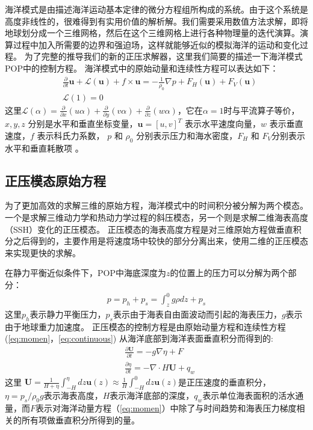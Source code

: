 海洋模式是由描述海洋运动基本定律的微分方程组所构成的系统。由于这个系统是高度非线性的，很难得到有实用价值的解析解。我们需要采用数值方法求解，即将地球划分成一个三维网格，然后在这个三维网格上进行各种物理量的迭代演算。演算过程中加入所需要的边界和强迫场，这样就能够近似的模拟海洋的运动和变化过程。
为了完整的推导我们的新的正压求解器，这里我们简要的描述一下海洋模式POP中的控制方程。
海洋模式中的原始动量和连续性方程可以表达如下：
\begin{align}
&\frac{\partial }{\partial t} \textbf{u} +\mathcal{L}(\textbf{u}) + f\times \textbf{u} = - \frac{1}{\rho_0}\nabla p +F_H(\textbf{u}) +F_V(\textbf{u}) \label{eq:momen}\\
&\mathcal{L}(1) = 0 \label{eq:continuous}
\end{align}
这里$\mathcal{L}(\alpha ) = \frac{\partial }{\partial x} (u\alpha)  +\frac{\partial }{\partial y} (v\alpha) +\frac{\partial }{\partial z} (w\alpha)$，它在$\alpha =1$时与平流算子等价，$x, y, z$ 分别是水平和垂直坐标变量，$\textbf{u} = [u, v]^T$ 表示水平速度向量，$w$ 表示垂直速度，$f$ 表示科氏力系数， $p$ 和 $\rho_0$ 分别表示压力和海水密度，$F_H$ 和 $F_V$分别表示水平和垂直耗散项 \cite{smith2010parallel}。  


\subsection{正压模态原始方程} \label{solver:mode}

为了更加高效的求解三维的原始方程，海洋模式中的时间积分被分解为两个模态。 一个是求解三维动力学和热动力学过程的斜压模态，另一个则是求解二维海表高度（SSH）变化的正压模态。
正压模态的海表高度方程是对三维原始方程做垂直积分之后得到的，主要作用是将速度场中较快的部分分离出来，使用二维的正压模态来实现更快的求解。

在静力平衡近似条件下，POP中海底深度为$z$的位置上的压力可以分解为两个部分：  
\begin{align}
\displaystyle p = p_h + p_s = \int^0_z g\rho dz +p_s
\end{align}
这里$p_h$表示静力平衡压力，$p_s$表示由于海表自由面波动而引起的海表压力，$g$表示由于地球重力加速度。 
正压模态的控制方程是由原始动量方程和连续性方程(\ref{eq:momen}，\ref{eq:continuous}) 从海洋底部到海洋表面垂直积分而得到的:
\begin{align}
&\displaystyle \frac{\partial \textbf{U} }{\partial t}  = -g \nabla \eta + F  \label{eq:baro_mon}\\
&\displaystyle \frac{\partial \eta }{\partial t} = - \nabla \cdot H\textbf{U} + q_w  \label{eq:baro_con}
\end{align}
这里  $\textbf{U} =  \frac{1}{H+\eta}\int_{-H}^\eta dz \textbf{u}(z) \approx \frac{1}{H }\int_{-H}^0 dz \textbf{u}(z)$是正压速度的垂直积分，
$\eta = p_s/{\rho_0g}$表示海表高度，$H$表示海洋底部的深度，$q_w$表示单位海表面积的活水通量，而$F$表示对海洋动量方程（\ref{eq:momen}）中除了与时间趋势和海表压力梯度相关的所有项做垂直积分所得到的量。
 
